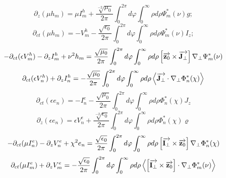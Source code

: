 \begin{equation}
\partial_z (\mu h_m) = \mu I_m^h + \frac{\sqrt[-2]{\mu_0}}{2 \pi}
\int_0^{2\pi} d \varphi \int_0^{\infty} \rho d \rho
\Psi_m^* (\nu) g;
\end{equation}
%
\begin{equation}
\partial_{ct} (\mu h_m) = - V_m^h - \frac{\sqrt{\epsilon_0}}{2 \pi}
\int_0^{2\pi} d \varphi \int_0^{\infty} \rho d \rho
\Psi_m^* (\nu) I_z;
\end{equation}
%
\begin{equation}
- \partial_{ct} (\epsilon V_m^h) - \partial_z I_m^h + \nu^2 h_m = 
\frac{\sqrt{\mu_0}}{2 \pi} \int_0^{2\pi} d \varphi 
\int_0^{\infty} \rho d \rho \left[ \overrightarrow{\mathbf z_0} \times \overrightarrow{\mathbf J_\perp} \right]
\nabla_\perp \Psi_m^* (\nu)
\end{equation}
%
\textcolor{lightgray} { \begin{equation*}
\partial_{ct} (\epsilon V_n^h) + \partial_z I_n^h = 
- \frac{\sqrt{\mu_0}}{2 \pi} \int_0^{2\pi} d \varphi 
\int_0^{\infty} \rho d \rho 
\left< \overrightarrow{\mathbf J_\perp} \cdot \nabla_\perp \Phi_n^* (\chi) \right>
\end{equation*} }
%
\begin{equation}
\partial_{ct} (\epsilon e_n) = - I_n^e - 
\frac{\sqrt{\mu_0}}{2 \pi} \int_0^{2\pi} d \varphi 
\int_0^{\infty} \rho d \rho \Phi_n^* (\chi) J_z
\end{equation}
%
\begin{equation}
\partial_{z} (\epsilon e_n) = \epsilon V_n^e + 
\frac{\sqrt[-2]{\epsilon_0}}{2 \pi} \int_0^{2\pi} d \varphi 
\int_0^{\infty} \rho d \rho \Phi_n^* (\chi) \varrho
\end{equation}
%
\begin{equation}
- \partial_{ct}(\mu I_n^e) - \partial_z V_n^e + \chi^2 e_n = 
\frac{\sqrt{\epsilon_0}}{2 \pi} \int_0^{2\pi} d \varphi 
\int_0^{\infty} \rho d \rho \left[ \overrightarrow{\mathbf I_\perp} \times \overrightarrow{\mathbf z_0} \right]
\nabla_\perp \Phi_n^* (\chi)
\end{equation}
%
\textcolor{lightgray} { \begin{equation*}
\partial_{ct}(\mu I_m^e) + \partial_z V_m^e = - 
\frac{\sqrt{\epsilon_0}}{2 \pi} \int_0^{2\pi} d \varphi 
\int_0^{\infty} \rho d \rho 
\left< \left[ \overrightarrow{\mathbf I_\perp} \times \overrightarrow{\mathbf z_0} \right]  \cdot  \nabla_\perp \Phi_m^* (\nu)  \right>
\end{equation*} }

